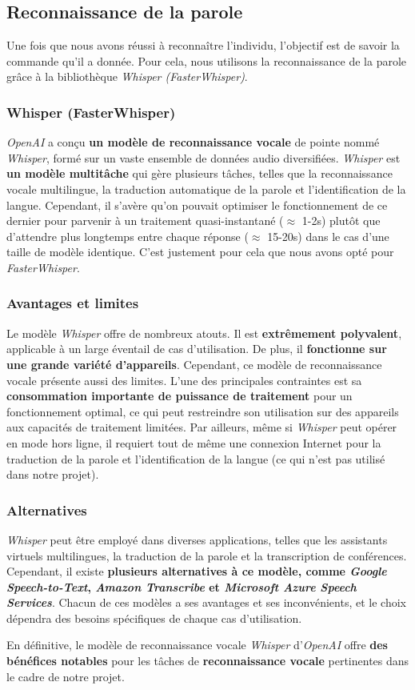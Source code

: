 \subsection{Reconnaissance de la parole}
\label{subsec:Reconnaissance_parole}

Une fois que nous avons réussi à reconnaître l'individu, l'objectif est de savoir la commande qu'il a donnée. Pour cela, nous utilisons la reconnaissance de la 
parole grâce à la bibliothèque \textit{Whisper (FasterWhisper)}.

\subsubsection*{Whisper (FasterWhisper)}

\textit{OpenAI} a conçu \textbf{un modèle de reconnaissance vocale} de pointe nommé \textit{Whisper}, formé sur un vaste ensemble de données audio diversifiées. 
\textit{Whisper} est \textbf{un modèle multitâche} qui gère plusieurs tâches, telles que la reconnaissance vocale multilingue, la traduction automatique de la parole et 
l'identification de la langue. Cependant, il s'avère qu'on pouvait optimiser le fonctionnement de ce dernier pour parvenir à un traitement quasi-instantané ($\approx$ 1-2s) 
plutôt que d'attendre plus longtemps entre chaque réponse ($\approx$ 15-20s) dans le cas d'une taille de modèle identique. C'est justement pour cela que nous avons opté pour \textit{FasterWhisper}.

\subsubsection*{Avantages et limites}
Le modèle \textit{Whisper} offre de nombreux atouts. Il est \textbf{extrêmement polyvalent}, applicable à un large éventail de cas d'utilisation. De plus, il \textbf{fonctionne 
sur une grande variété d'appareils}. Cependant, ce modèle de reconnaissance vocale présente aussi des limites. L'une des principales contraintes est sa \textbf{consommation 
importante de puissance de traitement} pour un fonctionnement optimal, ce qui peut restreindre son utilisation sur des appareils aux capacités de traitement limitées. 
Par ailleurs, même si \textit{Whisper} peut opérer en mode hors ligne, il requiert tout de même une connexion Internet pour la traduction de la parole et l'identification de la langue (ce qui n'est pas utilisé dans notre projet).

\subsubsection*{Alternatives}
\textit{Whisper} peut être employé dans diverses applications, telles que les assistants virtuels multilingues, la traduction de la parole et la transcription de conférences. 
Cependant, il existe \textbf{plusieurs alternatives à ce modèle, comme \textit{Google Speech-to-Text}, \textit{Amazon Transcribe} et \textit{Microsoft Azure Speech Services}}. 
Chacun de ces modèles a ses avantages et ses inconvénients, et le choix dépendra des besoins spécifiques de chaque cas d'utilisation.

En définitive, le modèle de reconnaissance vocale \textit{Whisper} d'\textit{OpenAI} offre \textbf{des bénéfices notables} pour les tâches de \textbf{reconnaissance vocale} pertinentes dans le cadre de notre projet.